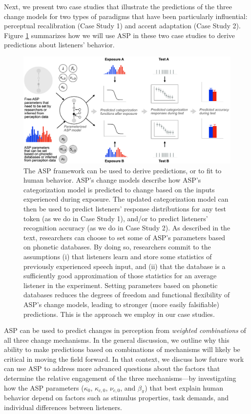 \documentclass[
  11pt,
  man,floatsintext]{apa6}
\begin{document}
Next, we present two case studies that illustrate the predictions of the three change models for two types of paradigms that have been particularly influential: perceptual recalibration (Case Study 1) and accent adaptation (Case Study 2). Figure \ref{fig:ASP-predictions} summarizes how we will use ASP in these two case studies to derive predictions about listeners' behavior.

\begin{figure}[h]
\begin{center}
\includegraphics{../figures/diagrams/predictive-power-simulations.png}
\caption{The ASP framework can be used to derive predictions, or to fit to human behavior. ASP's change models describe how ASP's categorization model is predicted to change based on the inputs experienced during exposure. The updated categorization model can then be used to predict listeners' response distributions for any test token (as we do in Case Study 1), and/or to predict listeners' recognition accuracy (as we do in Case Study 2). As described in the text, researchers can choose to set some of ASP's parameters based on phonetic databases. By doing so, researchers commit to the assumptions (i) that listeners learn and store some statistics of previously experienced speech input, and (ii) that the database is a sufficiently good approximation of those statistics for an average listener in the experiment. Setting parameters based on phonetic databases reduces the degrees of freedom and functional flexibility of ASP's change models, leading to stronger (more easily falsifiable) predictions. This is the approach we employ in our case studies.}\label{fig:ASP-predictions}
\end{center}
\end{figure}

ASP can be used to predict changes in perception from \emph{weighted combinations} of all three change mechanisms. In the general discussion, we outline why this ability to make predictions based on combinations of mechanisms will likely be critical in moving the field forward. In that context, we discuss how future work can use ASP to address more advanced questions about the factors that determine the relative engagement of the three mechanisms---by investigating how the ASP parameters (\(\kappa_0\), \(\kappa_{c,0}\), \(\nu_{c,0}\), and \(\beta_{\pi}\)) that best explain human behavior depend on factors such as stimulus properties, task demands, and individual differences between listeners.
\end{document}
